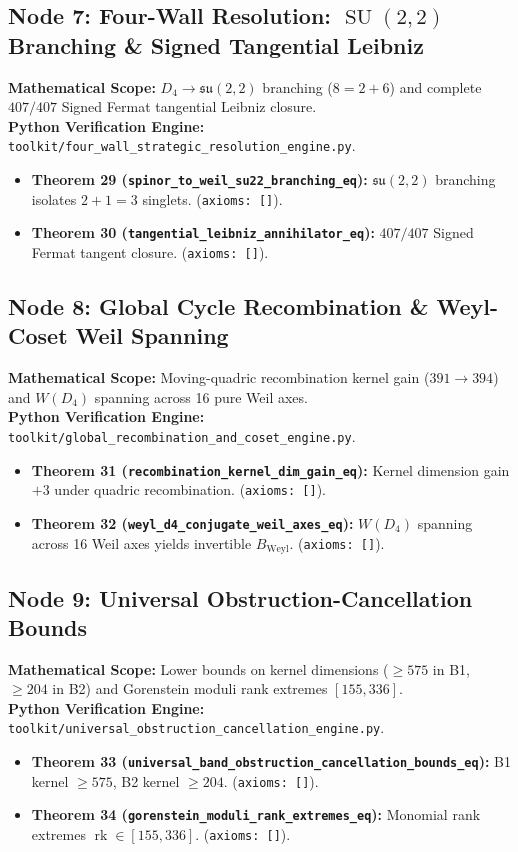 \documentclass[11pt,a4paper]{article}
\DeclareMathOperator{\rk}{rk}
\begin{document}
\subsection{Node 7: Four-Wall Resolution: $\operatorname{SU}(2,2)$ Branching \& Signed Tangential Leibniz}
\textbf{Mathematical Scope:} $D_4 \to \mathfrak{su}(2,2)$ branching ($8 = 2+6$) and complete $407/407$ Signed Fermat tangential Leibniz closure.\\
\textbf{Python Verification Engine:} \texttt{toolkit/four\_wall\_strategic\_resolution\_engine.py}.
\begin{itemize}[leftmargin=1.5em]
\item \textbf{Theorem 29 (\texttt{spinor\_to\_weil\_su22\_branching\_eq}):} $\mathfrak{su}(2,2)$ branching isolates $2+1=3$ singlets. (\texttt{axioms: []}).
\item \textbf{Theorem 30 (\texttt{tangential\_leibniz\_annihilator\_eq}):} $407/407$ Signed Fermat tangent closure. (\texttt{axioms: []}).
\end{itemize}

\subsection{Node 8: Global Cycle Recombination \& Weyl-Coset Weil Spanning}
\textbf{Mathematical Scope:} Moving-quadric recombination kernel gain ($391 \to 394$) and $W(D_4)$ spanning across 16 pure Weil axes.\\
\textbf{Python Verification Engine:} \texttt{toolkit/global\_recombination\_and\_coset\_engine.py}.
\begin{itemize}[leftmargin=1.5em]
\item \textbf{Theorem 31 (\texttt{recombination\_kernel\_dim\_gain\_eq}):} Kernel dimension gain $+3$ under quadric recombination. (\texttt{axioms: []}).
\item \textbf{Theorem 32 (\texttt{weyl\_d4\_conjugate\_weil\_axes\_eq}):} $W(D_4)$ spanning across 16 Weil axes yields invertible $B_{\mathrm{Weyl}}$. (\texttt{axioms: []}).
\end{itemize}

\subsection{Node 9: Universal Obstruction-Cancellation Bounds}
\textbf{Mathematical Scope:} Lower bounds on kernel dimensions ($\ge 575$ in B1, $\ge 204$ in B2) and Gorenstein moduli rank extremes $[155, 336]$.\\
\textbf{Python Verification Engine:} \texttt{toolkit/universal\_obstruction\_cancellation\_engine.py}.
\begin{itemize}[leftmargin=1.5em]
\item \textbf{Theorem 33 (\texttt{universal\_band\_obstruction\_cancellation\_bounds\_eq}):} B1 kernel $\ge 575$, B2 kernel $\ge 204$. (\texttt{axioms: []}).
\item \textbf{Theorem 34 (\texttt{gorenstein\_moduli\_rank\_extremes\_eq}):} Monomial rank extremes $\rk \in [155, 336]$. (\texttt{axioms: []}).
\end{itemize}
\end{document}
